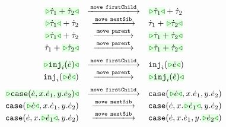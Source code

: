\begin{figure}
\begin{displaymath}
\begin{array}{@{}rcl}
  \TABperformMove
      {\zwsel{\tsum{\htau_1}{\htau_2}}}
      {\aMove{\dChild}}
      {      {\tsum{\zwsel{\htau_1}}{\htau_2}}}
  \\
  \TABperformMove
      {      {\tsum{\zwsel{\htau_1}}{\htau_2}}}
      {\aMove{\dNext}}
      {      {\tsum{{\htau_1}}{\zwsel{\htau_2}}}}
  \\
  \TABperformMove
      {      {\tsum{\zwsel{\htau_1}}{\htau_2}}}
      {\aMove{\dParent}}
      {\zwsel{\tsum{{\htau_1}}{{\htau_2}}}}
  \\
  \TABperformMove
      {      {\tsum{{\htau_1}}{{\zwsel{\htau_2}}}}}
      {\aMove{\dParent}}
      {\zwsel{\tsum{{\htau_1}}{\htau_2}}}
  \\[2mm]
  \TABperformMove
      {\zwsel{\hinj{i}{\hexp}}}
      {\aMove{\dChild}}
      {\hinj{i}{\zwsel{\hexp}}}      
  \\
  \TABperformMove
      {\hinj{i}{\zwsel{\hexp}}}      
      {\aMove{\dParent}}
      {\zwsel{\hinj{i}{\hexp}}}
  \\[2mm]
  \TABperformMove
      {\zwsel{\hcase{\hexp}{x}{\hexp_1}{y}{\hexp_2}}}
      {\aMove{\dChild}}
      {      {\hcase{\zwsel{\hexp}}{x}{\hexp_1}{y}{\hexp_2}}}
  \\
  \TABperformMove
      {      {\hcase{\zwsel{\hexp}}{x}{\hexp_1}{y}{\hexp_2}}}
      {\aMove{\dNext}}
      {      {\hcase{{\hexp}}{x}{\zwsel{\hexp_1}}{y}{\hexp_2}}}
  \\
  \TABperformMove
      {      {\hcase{{\hexp}}{x}{\zwsel{\hexp_1}}{y}{\hexp_2}}}
      {\aMove{\dNext}}
      {      {\hcase{{\hexp}}{x}{{\hexp_1}}{y}{\zwsel{\hexp_2}}}}

\end{array}
\end{displaymath}
\end{figure}
